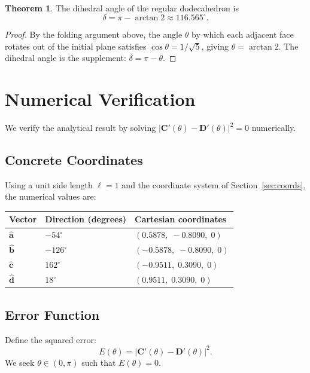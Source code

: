 \documentclass[11pt,a4paper]{article}
\newcommand{\vv}[1]{\mathbf{#1}}
\newcommand{\uv}[1]{\hat{\mathbf{#1}}}
\theoremstyle{definition}
\newtheorem{theorem}{Theorem}
\begin{document}
\begin{theorem}
The dihedral angle of the regular dodecahedron is
\[
  \delta = \pi - \arctan 2 \approx 116.565^\circ.
\]
\end{theorem}
\begin{proof}
By the folding argument above, the angle $\theta$ by which each adjacent face
rotates out of the initial plane satisfies $\cos\theta = 1/\sqrt{5}$, giving
$\theta = \arctan 2$. The dihedral angle is the supplement: $\delta = \pi - \theta$.
\end{proof}

\section{Numerical Verification}
\label{sec:numeric}

We verify the analytical result by solving $|\vv{C}'(\theta) - \vv{D}'(\theta)|^2 = 0$
numerically.

\subsection{Concrete Coordinates}

Using a unit side length $\ell = 1$ and the coordinate system of
Section~\ref{sec:coords}, the numerical values are:

\begin{center}
\begin{tabular}{@{}lll@{}}
\toprule
Vector & Direction (degrees) & Cartesian coordinates \\
\midrule
$\uv{a}$ & $-54^\circ$ & $(0.5878,\; -0.8090,\; 0)$ \\
$\uv{b}$ & $-126^\circ$ & $(-0.5878,\; -0.8090,\; 0)$ \\
$\uv{c}$ & $162^\circ$ & $(-0.9511,\; 0.3090,\; 0)$ \\
$\uv{d}$ & $18^\circ$ & $(0.9511,\; 0.3090,\; 0)$ \\
\bottomrule
\end{tabular}
\end{center}

\subsection{Error Function}

Define the squared error:
\[
  E(\theta) = |\vv{C}'(\theta) - \vv{D}'(\theta)|^2.
\]
We seek $\theta \in (0, \pi)$ such that $E(\theta) = 0$.
\end{document}
